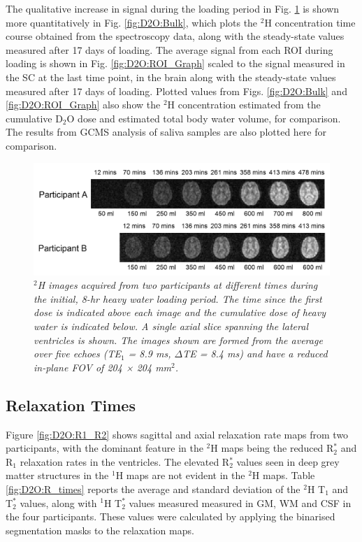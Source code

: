The qualitative increase in signal during the loading period in Fig. \ref{fig:D2O:Load} is shown more quantitatively in Fig. \ref{fig:D2O:Bulk}, which plots the $^2$H concentration time course obtained from the spectroscopy data, along with the steady-state values measured after 17 days of loading. The average signal from each \ac{ROI} during loading is shown in Fig. \ref{fig:D2O:ROI_Graph} scaled to the signal measured in the \ac{SC} at the last time point, in the brain along with the steady-state values measured after 17 days of loading. Plotted values from Figs. \ref{fig:D2O:Bulk} and \ref{fig:D2O:ROI_Graph} also show the $^2$H concentration estimated from the cumulative D$_2$O dose and estimated total body water volume, for comparison. The results from GCMS analysis of saliva samples are also plotted here for comparison.

\begin{figure}[H]
    \centering
    \includegraphics[width=1\textwidth]{Figures/D2O/Loading.png}
    \caption{\textit{$^2$H images acquired from two participants at different times during the initial, 8-hr heavy water loading period. The time since the first dose is indicated above each image and the cumulative dose of heavy water is indicated below. A single axial slice spanning the lateral ventricles is shown. The images shown are formed from the average over five echoes (TE$_1$ = 8.9 ms, $\Delta$TE = 8.4 ms) and have a reduced in-plane \ac{FOV} of 204 × 204 mm$^2$.}}
    \label{fig:D2O:Load}
\end{figure}

\subsection{Relaxation Times}

Figure \ref{fig:D2O:R1_R2} shows sagittal and axial relaxation rate maps from two participants, with the dominant feature in the $^2$H maps being the reduced R$_2^*$ and R$_1$ relaxation rates in the ventricles. The elevated R$_2^*$ values seen in deep grey matter structures in the $^1$H maps are not evident in the $^2$H maps. Table \ref{fig:D2O:R_times} reports the average and standard deviation of the $^2$H T$_1$ and T$_2^*$ values, along with $^1$H T$_2^*$ values measured measured in \ac{GM}, \ac{WM} and \ac{CSF} in the four participants. These values were calculated by applying the binarised segmentation masks to the relaxation maps.


